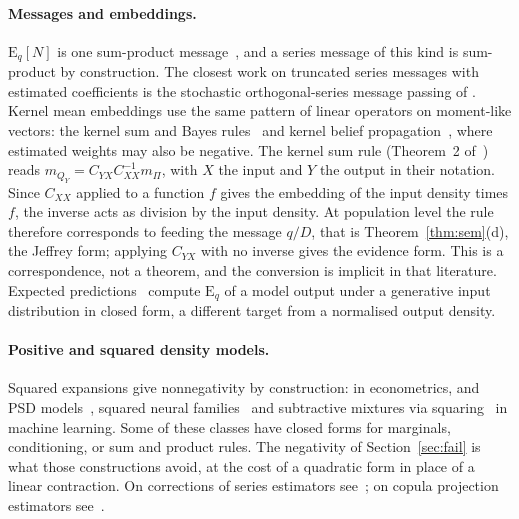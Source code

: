 \documentclass[10pt,a4paper]{article}
\newcommand{\Eq}{\mathrm{E}_q}
\theoremstyle{upright}
\begin{document}
\paragraph{Messages and embeddings.} $\Eq[N]$ is one sum-product message~\citep{kschischang2001factor}, and a series message of this kind is sum-product by construction. The closest work on truncated series messages with estimated coefficients is the stochastic orthogonal-series message passing of \citet{noorshams2013belief}. Kernel mean embeddings use the same pattern of linear operators on moment-like vectors: the kernel sum and Bayes rules~\citep{fukumizu2013kernel} and kernel belief propagation~\citep{song2011kernel}, where estimated weights may also be negative. The kernel sum rule (Theorem~2 of~\citep{fukumizu2013kernel}) reads $m_{Q_Y}=C_{YX}C_{XX}^{-1}m_\Pi$, with $X$ the input and $Y$ the output in their notation. Since $C_{XX}$ applied to a function $f$ gives the embedding of the input density times $f$, the inverse acts as division by the input density. At population level the rule therefore corresponds to feeding the message $q/D$, that is Theorem~\ref{thm:sem}(d), the Jeffrey form; applying $C_{YX}$ with no inverse gives the evidence form. This is a correspondence, not a theorem, and the conversion is implicit in that literature. Expected predictions~\citep{khosravi2019expected} compute $\Eq$ of a model output under a generative input distribution in closed form, a different target from a normalised output density.

\paragraph{Positive and squared density models.} Squared expansions give nonnegativity by construction: \citet{gallant1987semi} in econometrics, and PSD models~\citep{rudi2021psd}, squared neural families~\citep{tsuchida2023squared} and subtractive mixtures via squaring~\citep{loconte2024subtractive} in machine learning. Some of these classes have closed forms for marginals, conditioning, or sum and product rules. The negativity of Section~\ref{sec:fail} is what those constructions avoid, at the cost of a quadratic form in place of a linear contraction. On corrections of series estimators see~\citep{gajek1986improving,glad2003correction}; on copula projection estimators see~\citep{ngounoubakam2025nonparametric,chatrabgoun2017legendre}.
\end{document}
